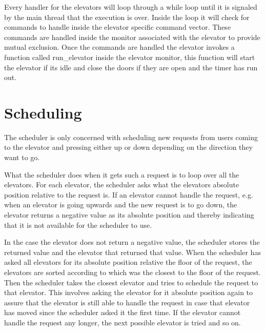\documentclass[10pt,a4paper]{article}
\begin{document}
Every handler for the elevators will loop through a while loop until it is signaled by the main thread that the execution is over. Inside the loop it will check for commands to handle inside the elevator specific command vector. These commands are handled inside the monitor associated with the elevator to provide mutual exclusion. Once the commands are handled the elevator invokes a function called run\_elevator inside the elevator monitor, this function will start the elevator if its idle and close the doors if they are open and the timer has run out.


\section{Scheduling}
The scheduler is only concerned with scheduling new requests from users coming to the elevator and pressing either up or down depending on the direction they want to go.

What the scheduler does when it gets such a request is to loop over all the elevators. For each elevator, the scheduler asks what the elevators absolute position relative to the request is. If an elevator cannot handle the request, e.g. when an elevator is going upwards and the new request is to go down, the elevator returns a negative value as its absolute position and thereby indicating that it is not available for the scheduler to use.

In the case the elevator does not return a negative value, the scheduler stores the returned value and the elevator that returned that value. When the scheduler has asked all elevators for its absolute position relative the floor of the request, the elevators are sorted according to which was the closest to the floor of the request. Then the scheduler takes the closest elevator and tries to schedule the request to that elevator. This involves asking the elevator for it absolute position
again to assure that the elevator is still able to handle the request in case that elevator has moved since the scheduler asked it the first time. If the elevator cannot handle the request any longer, the next possible elevator is tried and so on.
\end{document}
